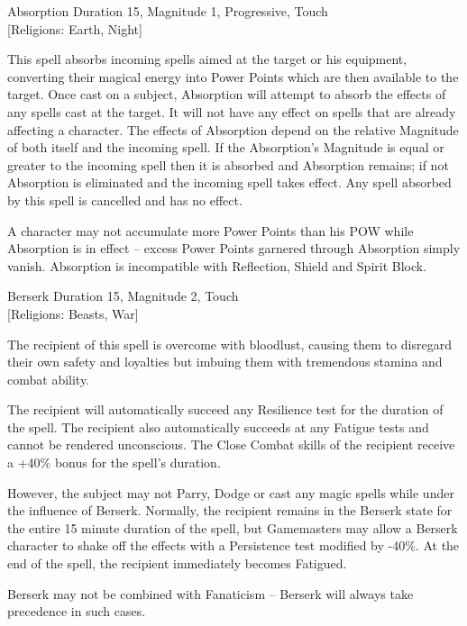 \begin{samepage}
\begin{rpg-spell}
{Absorption}
{Duration 15, Magnitude 1, Progressive, Touch\\{[Religions: Earth, Night]}}

This spell absorbs incoming spells aimed at the target or his equipment, converting their magical energy into Power Points which are then available to the target. Once cast on a subject, Absorption will attempt to absorb the effects of any spells cast at the target. It will not have any effect on spells that are already affecting a character. The effects of Absorption depend on the relative Magnitude of both itself and the incoming spell. If the Absorption's Magnitude is equal or greater to the incoming spell then it is absorbed and Absorption remains; if not Absorption is eliminated and the incoming spell takes effect. Any spell absorbed by this spell is cancelled and has no effect. 

A character may not accumulate more Power Points than his POW while Absorption is in effect – excess Power Points garnered through Absorption simply vanish. Absorption is incompatible with Reflection, Shield and Spirit Block.
\end{rpg-spell}
\end{samepage}

\begin{samepage}
\begin{rpg-spell}
{Berserk}
{Duration 15, Magnitude 2, Touch\\{[Religions: Beasts, War]}}

The recipient of this spell is overcome with bloodlust, causing them to disregard their own safety and loyalties but imbuing them with tremendous stamina and combat ability. 

The recipient will automatically succeed any Resilience test for the duration of the spell. The recipient also automatically succeeds at any Fatigue tests and cannot be rendered unconscious. The Close Combat skills of the recipient receive a +40\% bonus for the spell’s duration. 

However, the subject may not Parry, Dodge or cast any magic spells while under the influence of Berserk. Normally, the recipient remains in the Berserk state for the entire 15 minute duration of the spell, but Gamemasters may allow a Berserk character to shake off the effects with a Persistence test modified by -40\%. At the end of the spell, the recipient immediately becomes Fatigued. 

Berserk may not be combined with Fanaticism – Berserk will always take precedence in such cases. 
\end{rpg-spell}
\end{samepage}

